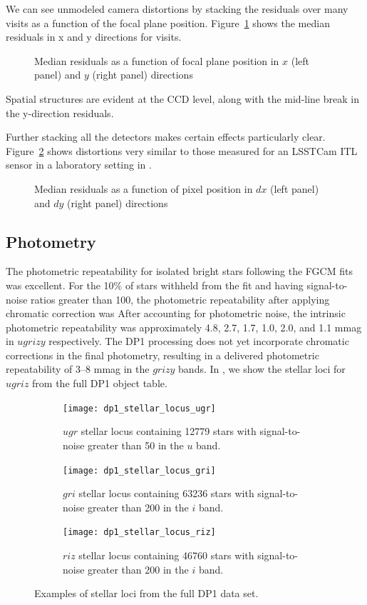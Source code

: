 We can see unmodeled camera distortions by stacking the residuals over many visits as a function of the focal plane position.
Figure~\ref{fig:Astrometry_FoV} shows the median residuals in x and y directions for \nvisits visits.
\begin{figure}[htb!]
\caption{Median residuals as a function of focal plane position in $x$ (left panel) and $y$ (right panel) directions}
\label{fig:Astrometry_FoV}
\end{figure}
Spatial structures are evident at the \gls{CCD} level, along with the mid-line break in the y-direction residuals.

Further stacking all the detectors makes certain effects particularly clear.
Figure~\ref{fig:Astrometry_CCD} shows distortions very similar to those measured for an \gls{LSSTCam} \gls{ITL} sensor in a laboratory setting in \citet{2023PASP..135k5003E}.
\begin{figure}[htb!]
\caption{\small Median residuals as a function of pixel position in $dx$ (left panel) and $dy$ (right panel) directions}
\label{fig:Astrometry_CCD}
\end{figure}

\subsection{Photometry}
The photometric repeatability for isolated bright stars following the \gls{FGCM} fits was excellent. 
For the 10\% of stars withheld from the fit and having signal-to-noise ratios greater than 100, the photometric repeatability after applying chromatic correction was 
After accounting for photometric noise, the intrinsic photometric repeatability was approximately 4.8, 2.7, 1.7, 1.0, 2.0, and 1.1 mmag in $ugrizy$ respectively.
The DP1 processing does not yet incorporate chromatic corrections in the final photometry, resulting in a delivered photometric repeatability of 3--8 mmag in the $grizy$ bands.
In , we show the stellar loci for $ugriz$ from the full DP1 object table.
\begin{figure}[hbt!]
  \centering
  \begin{subfigure}[t]{0.31\textwidth}
  \texttt{[image: dp1\_stellar\_locus\_ugr]}
  \caption{$ugr$ stellar locus containing 12779 stars with signal-to-noise greater than 50 in the $u$ band.}
  \end{subfigure}\hfill
  \begin{subfigure}[t]{0.31\textwidth}
  \texttt{[image: dp1\_stellar\_locus\_gri]}
  \caption{$gri$ stellar locus containing 63236 stars with signal-to-noise greater than 200 in the $i$ band.}
  \end{subfigure}\hfill
    \begin{subfigure}[t]{0.31\textwidth}
  \texttt{[image: dp1\_stellar\_locus\_riz]}
  \caption{$riz$ stellar locus containing 46760 stars with signal-to-noise greater than 200 in the $i$ band.}
  \end{subfigure}\hfill
\caption{Examples of stellar loci from the full DP1 data set.}
  \label{fig:stellarloci}
\end{figure}


